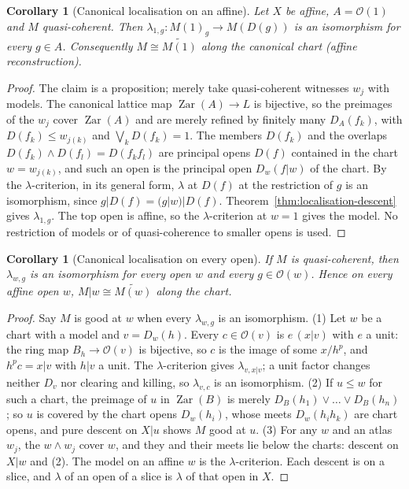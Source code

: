 \documentclass[11pt]{amsart}
\newtheorem{corollary}[theorem]{Corollary}
\theoremstyle{definition}\newtheorem{definition}[theorem]{Definition}
\theoremstyle{remark}\newtheorem{remark}[theorem]{Remark}
\newcommand{\OO}{\mathcal O}
\begin{document}
\begin{corollary}[Canonical localisation on an affine]
\label{thm:principal-module-localisation}\label{cor:affine-basic-sections}
Let $X$ be affine, $A=\OO(1)$ and $M$ quasi-coherent. Then
$\lambda_{1,g}:M(1)_g\to M(D(g))$ is an isomorphism for every
$g\in A$. Consequently $M\cong\widetilde{M(1)}$ along the canonical
chart (affine reconstruction).
\end{corollary}
\begin{proof}
The claim is a proposition; merely take quasi-coherent witnesses
$w_j$ with models. The canonical lattice map
$\operatorname{Zar}(A)\to L$ is bijective, so the preimages of the
$w_j$ cover $\operatorname{Zar}(A)$ and are merely refined by finitely
many $D_A(f_k)$, with $D(f_k)\le w_{j(k)}$ and $\bigvee_kD(f_k)=1$.
The members $D(f_k)$ and the overlaps $D(f_k)\wedge D(f_l)=D(f_kf_l)$
are principal opens $D(f)$ contained in the chart $w=w_{j(k)}$, and
such an open is the principal open $D_w(f|w)$ of the chart. By the
$\lambda$-criterion, in its general form, $\lambda$ at $D(f)$ at the
restriction of $g$ is an isomorphism, since $g|D(f)=(g|w)|D(f)$.
Theorem~\ref{thm:localisation-descent} gives $\lambda_{1,g}$. The top
open is affine, so the $\lambda$-criterion at $w=1$ gives the model.
No restriction of models or of quasi-coherence to smaller opens is
used.
\end{proof}

\begin{corollary}[Canonical localisation on every open]\label{cor:lambda-everywhere}
If $M$ is quasi-coherent, then $\lambda_{w,g}$ is an isomorphism for
every open $w$ and every $g\in\OO(w)$. Hence on every affine open $w$,
$M|w\cong\widetilde{M(w)}$ along the chart.
\end{corollary}
\begin{proof}
Say $M$ is good at $w$ when every $\lambda_{w,g}$ is an isomorphism.
(1) Let $w$ be a chart with a model and $v=D_w(h)$. Every $c\in\OO(v)$
is $e\,(x|v)$ with $e$ a unit: the ring map $B_h\to\OO(v)$ is
bijective, so $c$ is the image of some $x/h^p$, and $h^pc=x|v$ with
$h|v$ a unit. The $\lambda$-criterion gives $\lambda_{v,x|v}$; a unit
factor changes neither $D_v$ nor clearing and killing, so
$\lambda_{v,c}$ is an isomorphism. (2) If $u\le w$ for such a chart,
the preimage of $u$ in $\operatorname{Zar}(B)$ is merely
$D_B(h_1)\vee\dots\vee D_B(h_n)$; so $u$ is covered by the chart opens
$D_w(h_i)$, whose meets $D_w(h_ih_k)$ are chart opens, and pure descent
on $X|u$ shows $M$ good at $u$. (3) For any $w$ and an atlas $w_j$, the
$w\wedge w_j$ cover $w$, and they and their meets lie below the charts:
descent on $X|w$ and (2). The model on an affine $w$ is the
$\lambda$-criterion. Each descent is on a slice, and $\lambda$ of an
open of a slice is $\lambda$ of that open in $X$.
\end{proof}
\end{document}
